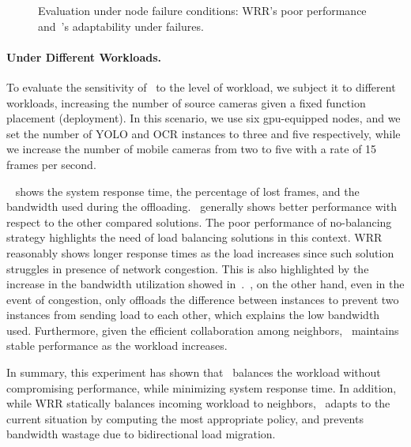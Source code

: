 \begin{figure}[htb]
\begin{minipage}[t]{.32\linewidth}
		\label{fig:adaptability_response_time}
	\end{minipage}
	\vspace{-1mm}
	\caption{Evaluation under node failure conditions: WRR's poor performance and~\videojam{}'s adaptability under failures.}
	\vspace{-3mm}
	\label{fig:adaptability}
\end{figure}


\paragraph{\videojam{} Under Different Workloads.} To evaluate the sensitivity of~\videojam{} to the level of workload, we subject it to different workloads, increasing the number of source cameras given a fixed function placement (deployment). In this scenario, we use six \acrshort{gpu}-equipped nodes, and we set the number of YOLO and OCR instances to three and five respectively, while we increase the number of mobile cameras from two to five with a rate of 15 frames per second. 

~ shows the system response time, the percentage of lost frames, and the bandwidth used during the offloading.~\videojam{} generally shows better performance with respect to the other compared solutions. The poor performance of no-balancing strategy highlights the need of load balancing solutions in this context. WRR reasonably shows longer response times as the load increases since such solution struggles in presence of network congestion. This is also highlighted by the increase in the bandwidth utilization showed in~.~\videojam{}, on the other hand, even in the event of congestion, only offloads the difference between instances to prevent two instances from sending load to each other, which explains the low bandwidth used. Furthermore, given the efficient collaboration among neighbors,~\videojam{} maintains stable performance as the workload increases.

In summary, this experiment has shown that~\videojam{} balances the workload without compromising performance, while minimizing system response time. In addition, while WRR statically balances incoming workload to neighbors,~\videojam{} adapts to the current situation by computing the most appropriate policy, and prevents bandwidth wastage due to bidirectional load migration.



